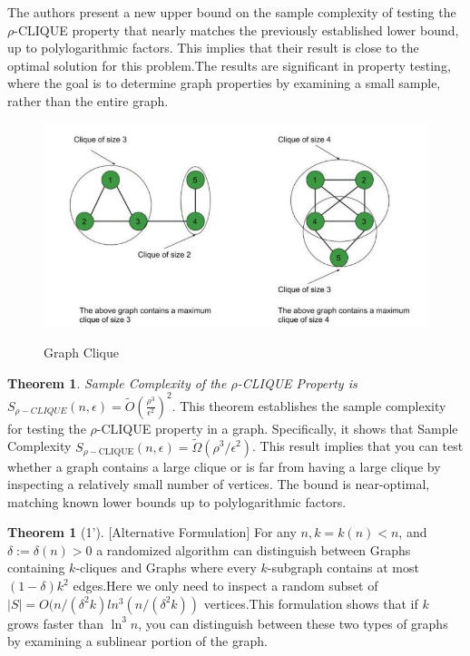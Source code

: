 \documentclass[preprint,11pt]{elsarticle}
\theoremstyle{definition}
\newtheorem{theorem}{Theorem}
\newtheorem*{manualtheorem}{Theorem}
\begin{document}
\begin{multicols}{2}
   The authors present a new upper bound on the sample complexity of testing the $\rho$-CLIQUE property that nearly matches the previously established lower bound, up to polylogarithmic factors. This implies that their result is close to the optimal solution for this problem.The results are significant in property testing, where the goal is to determine graph properties by examining a small sample, rather than the entire graph.
 \begin{figure}[H]
    \centering
    \includegraphics[width=\columnwidth]{images/graphClique.jpg} 
    \caption{Graph Clique}\cite{GFG2024a}
    \label{fig:Fig 1}
\end{figure}
\begin{theorem}\textit{Sample Complexity of the $\rho$-CLIQUE Property is $S_{\rho-CLIQUE}(n,\epsilon)=\tilde{O}(\frac{\rho^3}{\epsilon^2})^2$}.
This theorem establishes the sample complexity for testing the $\rho$-CLIQUE property in a graph. Specifically, it shows that Sample Complexity $S_{\rho-\text{CLIQUE}}(n,\epsilon)=\tilde{\Omega}(\rho^3/\epsilon^2)$. This result implies that you can test whether a graph  contains a large clique or is far from having a large clique by inspecting a relatively small number of vertices. The bound is near-optimal, matching known lower bounds up to polylogarithmic factors.
\end{theorem}
\begin{manualtheorem}[1'][Alternative Formulation]
 For any $n , k=k(n) < n$, and $\delta:=\delta(n) > 0$ a randomized algorithm can distinguish between Graphs containing $k$-cliques and Graphs where every $k$-subgraph contains at most $(1-\delta)k^2$ edges.Here we only need to inspect a random subset of $|S|=O(n/(\delta^2k){ln^3(n/(\delta^2k))}$ vertices.This formulation shows that if $k$ grows faster than $\ln^3{n}$, you can distinguish between these two types of graphs by examining a sublinear portion of the graph.

\end{manualtheorem}
\end{multicols}
\end{document}
